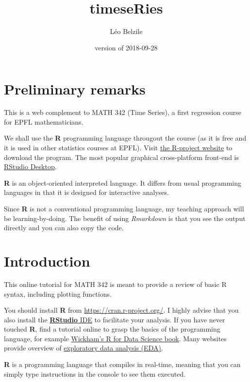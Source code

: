 \documentclass[]{book}
\title{timeseRies}
\author{Léo Belzile}
\date{version of 2018-09-28}
\begin{document}
\maketitle

{
\setcounter{tocdepth}{1}
\tableofcontents
}
\chapter*{Preliminary remarks}\label{preliminary-remarks}

This is a web complement to MATH 342 (Time Series), a first regression
course for EPFL mathematicians.

We shall use the \textbf{R} programming language througout the course
(as it is free and it is used in other statistics courses at EPFL).
Visit \href{https://cran.r-project.org/}{the R-project website} to
download the program. The most popular graphical cross-platform
front-end is
\href{https://www.rstudio.com/products/rstudio/download/}{RStudio
Desktop}.

\textbf{R} is an object-oriented interpreted language. It differs from
usual programming languages in that it is designed for interactive
analyses.

Since \textbf{R} is not a conventional programming language, my teaching
approach will be learning-by-doing. The benefit of using
\emph{Rmarkdown} is that you see the output directly and you can also
copy the code.

\chapter{Introduction}\label{introduction}

This online tutorial for MATH 342 is meant to provide a review of basic
R syntax, including plotting functions.

You should install \textbf{R} from \url{https://cran.r-project.org/}. I
highly advise that you also install the
\href{http://rstudio.com}{\textbf{RStudio} IDE} to facilitate your
analysis. If you have never touched \textbf{R}, find a tutorial online
to grasp the basics of the programming language, for example
\href{http://r4ds.had.co.nz/}{Wickham's R for Data Science book}. Many
websites provide overview of
\href{http://r4ds.had.co.nz/exploratory-data-analysis.html}{exploratory
data analysis (EDA)}.

\textbf{R} is a programming language that compiles in real-time, meaning
that you can simply type instructions in the console to see them
executed.
\end{document}
